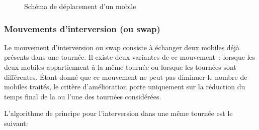 			\begin{figure}[h!]
			\begin{subfigure}[b]{.54\linewidth}
				\centering
				\begin{tikzpicture}[schema]
					
				\end{tikzpicture}
				\label{subfig:move_move1route}
			\end{subfigure}
			\hfill
			\begin{subfigure}[b]{.45\linewidth}
				\centering
				\begin{tikzpicture}[schema]
					
				\end{tikzpicture}
				\label{subfig:move_move2routes}
			\end{subfigure}
			\caption{Schéma de déplacement d'un mobile}
			\label{fig:move_move}
			\end{figure}

		\subsubsection{Mouvements d'interversion (ou swap)}
			Le mouvement d'interversion ou swap consiste à échanger deux mobiles déjà présents dans une tournée. Il existe deux variantes de ce mouvement : lorsque les deux mobiles appartiennent à la même tournée ou lorsque les tournées sont différentes. Étant donné que ce mouvement ne peut pas diminuer le nombre de mobiles traités, le critère d'amélioration porte uniquement sur la réduction du temps final de la ou l'une des tournées considérées.

			L'algorithme de principe pour l'interversion dans une même tournée est le suivant:
			\begin{code}
				\begin{algo}[informal]
					\BEGIN
								\ENDFORGEN
							\ENDFORGEN
						\ENDFORGEN
					\END
				\end{algo}
			\end{code}

